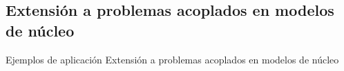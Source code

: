\subsection{Extensión a problemas acoplados en modelos de núcleo}

\begin{frame}
{Ejemplos de aplicación}
{Extensión a problemas acoplados en modelos de núcleo}

\end{frame}

